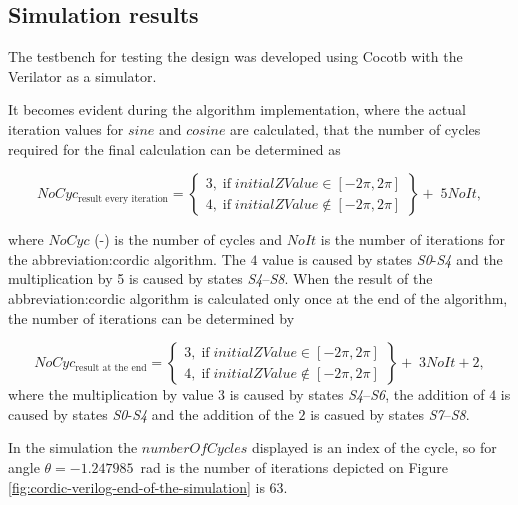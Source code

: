 \documentclass[a4paper, twoside, 11pt]{article}
\begin{document}
    \subsection{Simulation results}
    The testbench for testing the design was developed using Cocotb \cite{cocotb} with the Verilator \cite{verilator} as a simulator.\par
    It becomes evident during the algorithm implementation, where the actual iteration values for $sine$ and $cosine$ are calculated, that the number of cycles required for the final calculation can be determined as

    \begin{equation}
                NoCyc_\text{result every iteration} = 
                \left\{
                \begin{array}{lr}
                    3,\;\text{if}\;initialZValue \in [-2 \pi, 2 \pi]\\
                    4,\;\text{if}\;initialZValue \notin [-2 \pi, 2 \pi]
                \end{array}
                \right\}
         + \;5 NoIt,
    \end{equation}

    where $NoCyc$ (-) is the number of cycles and $NoIt$ is the number of iterations for the \gls{abbreviation:cordic} algorithm. The $4$ value is caused by states \textit{S0}-\textit{S4} and the multiplication by 5 is caused by states \textit{S4}–\textit{S8}. When the result of the \gls{abbreviation:cordic} algorithm is calculated only once at the end of the algorithm, the number of iterations can be determined by

    \begin{equation}
        NoCyc_\text{result at the end} = 
                \left\{
                \begin{array}{lr}
                    3,\;\text{if}\;initialZValue \in [-2 \pi, 2 \pi]\\
                    4,\;\text{if}\;initialZValue \notin [-2 \pi, 2 \pi]
                \end{array}
                \right\}
            +\;3 NoIt + 2,
    \end{equation}
    where the multiplication by value 3 is caused by states \textit{S4}–\textit{S6}, the addition of $4$ is caused by states \textit{S0}-\textit{S4} and the addition of the $2$ is casued by states \textit{S7}–\textit{S8}.\par
    \par
    In the simulation the $numberOfCycles$ displayed is an index of the cycle, so for angle $\theta = -1.247985$~rad is the number of iterations depicted on Figure \ref{fig:cordic-verilog-end-of-the-simulation} is $63$.
\end{document}
